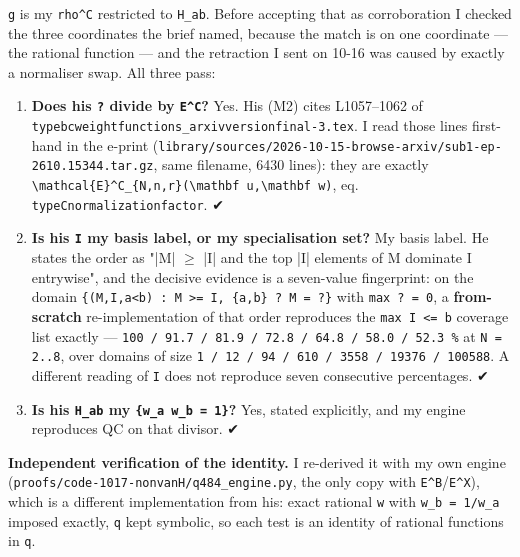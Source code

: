 \documentclass[11pt,a4paper]{article}
\begin{document}
\mbox{\texttt{g}} is my \mbox{\texttt{rho\textasciicircum{}C}} restricted to \mbox{\texttt{H\_ab}}. Before accepting that as corroboration I checked the three coordinates the brief named, because the match is on one coordinate --- the rational function --- and the retraction I sent on 10-16 was caused by exactly a normaliser swap. All three pass:

\begin{enumerate}
\item \textbf{Does his \mbox{\texttt{?}} divide by \mbox{\texttt{E\textasciicircum{}C}}?} Yes. His (M2) cites L1057--1062 of \mbox{\texttt{typebcweightfunctions\_arxivversionfinal-3.tex}}. I read those lines first-hand in the e-print (\mbox{\texttt{library/sources/2026-10-15-browse-arxiv/sub1-ep-2610.15344.tar.gz}}, same filename, 6430 lines): they are exactly \mbox{\texttt{\textbackslash{}mathcal\{E\}\textasciicircum{}C\_\{N,n,r\}(\textbackslash{}mathbf u,\textbackslash{}mathbf w)}}, eq. \mbox{\texttt{typeCnormalizationfactor}}. ✔
\item \textbf{Is his \mbox{\texttt{I}} my basis label, or my specialisation set?} My basis label. He states the order as "|M| $\geq$ |I| and the top |I| elements of M dominate I entrywise", and the decisive evidence is a seven-value fingerprint: on the domain \mbox{\texttt{\{(M,I,a<b) : M >= I, \{a,b\} ? M = ?\}}} with \mbox{\texttt{max ? = 0}}, a \textbf{from-scratch} re-implementation of that order reproduces the \mbox{\texttt{max I <= b}} coverage list exactly --- \mbox{\texttt{100 / 91.7 / 81.9 / 72.8 / 64.8 / 58.0 / 52.3 \%}} at \mbox{\texttt{N = 2..8}}, over domains of size \mbox{\texttt{1 / 12 / 94 / 610 / 3558 / 19376 / 100588}}. A different reading of \mbox{\texttt{I}} does not reproduce seven consecutive percentages. ✔
\item \textbf{Is his \mbox{\texttt{H\_ab}} my \mbox{\texttt{\{w\_a w\_b = 1\}}}?} Yes, stated explicitly, and my engine reproduces QC on that divisor. ✔
\end{enumerate}

\textbf{Independent verification of the identity.} I re-derived it with my own engine (\mbox{\texttt{proofs/code-1017-nonvanH/q484\_engine.py}}, the only copy with \mbox{\texttt{E\textasciicircum{}B}}/\mbox{\texttt{E\textasciicircum{}X}}), which is a different implementation from his: exact rational \mbox{\texttt{w}} with \mbox{\texttt{w\_b = 1/w\_a}} imposed exactly, \mbox{\texttt{q}} kept symbolic, so each test is an identity of rational functions in \mbox{\texttt{q}}.
\end{document}
